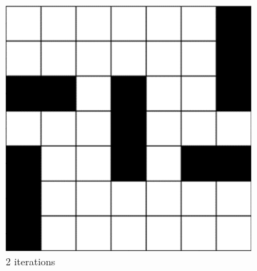 \begin{figure}[H]
	\centering
	\begin{subfigure}[t]{0.3\textwidth}
		\centering
		\includegraphics[width=\textwidth]{si_ls_2.png}
		\caption{2 iterations}
	\end{subfigure}
	\hfill
	\begin{subfigure}[t]{0.3\textwidth}
		\centering

\end{subfigure}
\end{figure}

